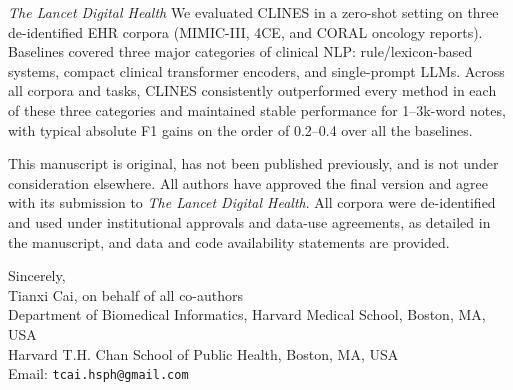 \documentclass[12pt]{letter}
\begin{document}
\begin{letter}{\textit{The Lancet Digital Health}}
		We evaluated CLINES in a zero-shot setting on three de-identified EHR corpora (MIMIC-III, 4CE, and CORAL oncology reports). Baselines covered three major categories of clinical NLP: rule/lexicon-based systems, compact clinical transformer encoders, and single-prompt LLMs. Across all corpora and tasks, CLINES consistently outperformed every method in each of these three categories and maintained stable performance for 1--3k-word notes, with typical absolute F1 gains on the order of 0.2--0.4 over all the baselines.
		
		This manuscript is original, has not been published previously, and is not under consideration elsewhere. All authors have approved the final version and agree with its submission to \textit{The Lancet Digital Health}. All corpora were de-identified and used under institutional approvals and data-use agreements, as detailed in the manuscript, and data and code availability statements are provided.
		
		\closing{Sincerely,\\[1ex]
			Tianxi Cai, on behalf of all co-authors\\
			Department of Biomedical Informatics, Harvard Medical School, Boston, MA, USA\\
			Harvard T.H. Chan School of Public Health, Boston, MA, USA\\
			Email: \texttt{tcai.hsph@gmail.com}
		}
		
	\end{letter}
	
\end{document}
